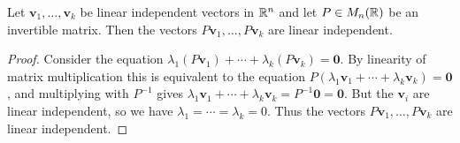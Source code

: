 \documentclass[10pt, a4paper]{article}
\newcommand{\mbf}[1]{\mathbf{#1}}
\begin{document}
\begin{lemma}\label{pre_linalg_lem_linindepvecmulmatrisindep}
    Let $\mbf{v}_1, \dotsc, \mbf{v}_k$ be linear independent vectors in $\mathbb{R} ^ n$ and let $P \in M_n(\mathbb{R})$ be an invertible matrix.
    Then the vectors $P\mbf{v}_1, \dotsc,P\mbf{v}_k$ are linear independent.
    \begin{proof}
        Consider the equation $\lambda_1(P\mbf{v}_1) + \dotsi + \lambda_k(P\mbf{v}_k) = \mbf{0}$.
        By linearity of matrix multiplication this is equivalent to the equation $P(\lambda_1\mbf{v}_1 + \dotsi + \lambda_k\mbf{v}_k) = \mbf{0}$,
        and multiplying with $P ^ {-1}$ gives $\lambda_1\mbf{v}_1 + \dotsi + \lambda_k\mbf{v}_k = P ^ {-1}\mbf{0} = \mbf{0}$.
        But the $\mbf{v}_i$ are linear independent,
        so we have $\lambda_1 = \dotsi = \lambda_k = 0$.
        Thus the vectors $P\mbf{v}_1, \dotsc, P\mbf{v}_k$ are linear independent.
    \end{proof}
\end{lemma}
\end{document}
